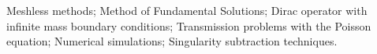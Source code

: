 \acresetall
\noindent
Meshless methods; Method of Fundamental Solutions; Dirac operator with infinite mass boundary conditions; Transmission problems with the Poisson equation; Numerical simulations; Singularity subtraction techniques.